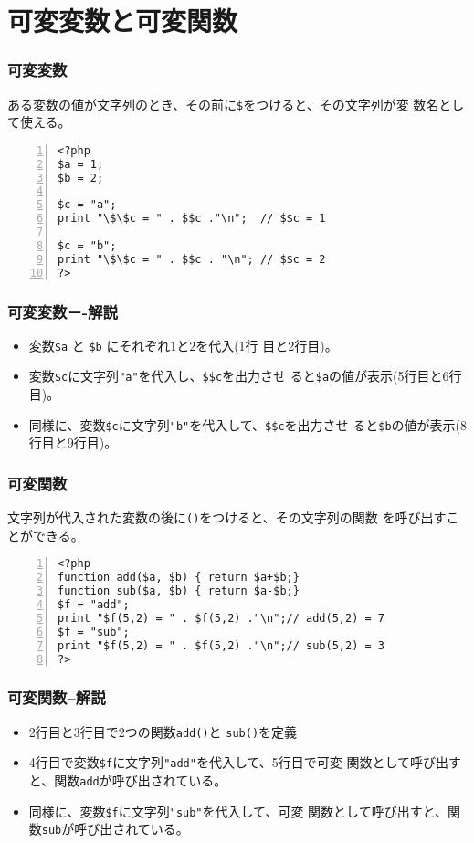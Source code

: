 \section{可変変数と可変関数}
 \begin{frame}[containsverbatim]
  \frametitle{可変変数}
ある変数の値が文字列のとき、その前に\verb+$+をつけると、その文字列が変
  数名として使える。
\begin{Verbatim}[numbers=left, fontsize=\small]
<?php
$a = 1;
$b = 2;

$c = "a";
print "\$\$c = " . $$c ."\n";  // $$c = 1

$c = "b";
print "\$\$c = " . $$c . "\n"; // $$c = 2
?>
\end{Verbatim}
 \end{frame}
 \begin{frame}[containsverbatim]
  \frametitle{可変変数－-解説}
  \begin{itemize}\upshape
   \item 変数\verb+$a+ と \verb+$b+ にそれぞれ$1$と$2$を代入(1行
         目と2行目)。
   \item 変数\verb+$c+に文字列\verb+"a"+を代入し、\verb+$$c+を出力させ
         ると\verb+$a+の値が表示(5行目と6行目)。
   \item 同様に、変数\verb+$c+に文字列\verb+"b"+を代入して、\verb+$$c+を出力させ
         ると\verb+$b+の値が表示(8行目と9行目)。
  \end{itemize}
 \end{frame}
\fi
 \begin{frame}[containsverbatim]
  \frametitle{可変関数}
 文字列が代入された変数の後に\texttt{()}をつけると、その文字列の関数
  を呼び出すことができる。
\begin{Verbatim}[fontsize=\small,numbers=left]
<?php
function add($a, $b) { return $a+$b;}
function sub($a, $b) { return $a-$b;}
$f = "add";
print "$f(5,2) = " . $f(5,2) ."\n";// add(5,2) = 7
$f = "sub";
print "$f(5,2) = " . $f(5,2) ."\n";// sub(5,2) = 3
?>
\end{Verbatim}
 \end{frame}
  \begin{frame}[containsverbatim]
  \frametitle{可変関数--解説}
\begin{itemize}
\item 2行目と3行目で2つの関数\texttt{add()}と
       \texttt{sub()}を定義
 \item 4行目で変数\Verb+$f+に文字列\Verb+"add"+を代入して、5行目で可変
       関数として呼び出すと、関数\texttt{add}が呼び出されている。
 \item 同様に、変数\Verb+$f+に文字列\Verb+"sub"+を代入して、可変
       関数として呼び出すと、関数\texttt{sub}が呼び出されている。
\end{itemize}
\end{frame}
